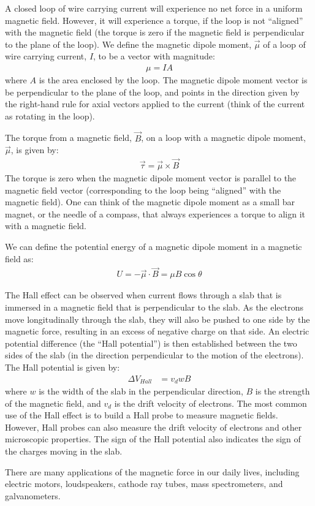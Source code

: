 \begin{chapterSummary}
A closed loop of wire carrying current will experience no net force in a uniform magnetic field. However, it will experience a torque, if the loop is not ``aligned'' with the magnetic field (the torque is zero if the magnetic field is perpendicular to the plane of the loop). We define the magnetic dipole moment, $\vec \mu$ of a loop of wire carrying current, $I$, to be a vector with magnitude:
\begin{align*}
\mu = IA
\end{align*}
where $A$ is the area enclosed by the loop. The magnetic dipole moment vector is be perpendicular to the plane of the loop, and points in the direction given by the right-hand rule for axial vectors applied to the current (think of the current as rotating in the loop).

The torque from a magnetic field, $\vec B$, on a loop with a magnetic dipole moment, $\vec \mu$, is given by:
\begin{align*}
\vec \tau = \vec \mu \times \vec B
\end{align*}
The torque is zero when the magnetic dipole moment vector is parallel to the magnetic field vector (corresponding to the loop being ``aligned'' with the magnetic field). One can think of the magnetic dipole moment as a small bar magnet, or the needle of a compass, that always experiences a torque to align it with a magnetic field.

We can define the potential energy of a magnetic dipole moment in a magnetic field as:
\begin{align*}
U= -\vec \mu \cdot \vec B = \mu B \cos\theta
\end{align*}

The Hall effect can be observed when current flows through a slab that is immersed in a magnetic field that is perpendicular to the slab. As the electrons move longitudinally through the slab, they will also be pushed to one side by the magnetic force, resulting in an excess of negative charge on that side. An electric potential difference (the ``Hall potential'') is then established between the two sides of the slab (in the direction perpendicular to the motion of the electrons). The Hall potential is given by:
\begin{align*}
\Delta V_{Hall}&= v_d wB
\end{align*}
where $w$ is the width of the slab in the perpendicular direction, $B$ is the strength of the magnetic field, and $v_d$ is the drift velocity of electrons. The most common use of the Hall effect is to build a Hall probe to measure magnetic fields. However, Hall probes can also measure the drift velocity of electrons and other microscopic properties. The sign of the Hall potential also indicates the sign of the charges moving in the slab.

There are many applications of the magnetic force in our daily lives, including electric motors, loudspeakers, cathode ray tubes, mass spectrometers, and galvanometers.

\end{chapterSummary}

